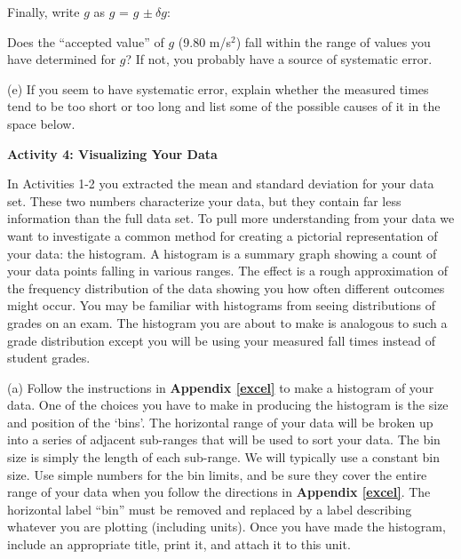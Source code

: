 

Finally, write $g$ as $g$ = $g$ \(\pm\ \delta g\):

Does the ``accepted value'' of $g$ (9.80 m/s$^2$) fall within the range of 
values you have determined for $g$? If not, you probably have a source of 
systematic error.

(e) If you seem to have systematic error, explain whether the measured times
tend to be too short or too long and list some of the possible causes of it
in the space below.
\answerspace{30mm}

\textbf{Activity 4: Visualizing Your Data}

In Activities 1-2 you extracted the mean and standard deviation for your data set. 
These two numbers characterize your data, but they contain far less information than the full
data set.
To pull more understanding from your data we want to investigate a common method for
creating a pictorial representation of your data: the histogram.
A histogram is a summary graph showing a count of your data points falling in various ranges. 
The effect is a rough approximation of the frequency distribution of the data showing you how often different outcomes might occur.
You may be familiar with histograms from seeing distributions of grades on an exam.
The histogram you are about to make is analogous to such a grade distribution except you will be using your measured fall times
instead of student grades.

(a) Follow the instructions in \textbf{Appendix \ref{excel}} to make a histogram of your data. 
One of the choices you have to make in producing the histogram is the size and position of the `bins'.
The horizontal range of your data will be broken up into a series of adjacent sub-ranges that will be used to sort your data. The bin size is simply the length of each sub-range. 
We will typically use a constant bin size.
Use simple numbers for the bin limits, and be sure they cover the entire range of your data when you follow the directions in \textbf{Appendix \ref{excel}}.  The horizontal label ``bin'' must be removed and replaced by a label describing whatever you are plotting (including units).
Once you have made the histogram, include an appropriate title, print it, and attach it to this unit.
\vspace{2mm}

